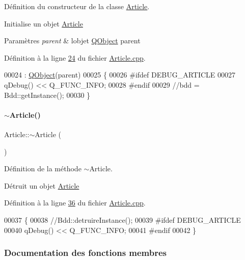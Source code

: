 Définition du constructeur de la classe \hyperlink{class_article}{Article}. 

Initialise un objet \hyperlink{class_article}{Article} 
\begin{DoxyParams}{Paramètres}
{\em parent} & l\textquotesingle{}objet \hyperlink{class_q_object}{Q\+Object} parent \\
\hline
\end{DoxyParams}


Définition à la ligne \hyperlink{_article_8cpp_source_l00024}{24} du fichier \hyperlink{_article_8cpp_source}{Article.\+cpp}.


\begin{DoxyCode}
00024                                 : \hyperlink{class_q_object}{QObject}(parent)
00025 \{
00026 \textcolor{preprocessor}{    #ifdef DEBUG\_ARTICLE}
00027         qDebug() << Q\_FUNC\_INFO;
00028 \textcolor{preprocessor}{    #endif}
00029     \textcolor{comment}{//bdd = Bdd::getInstance();}
00030 \}
\end{DoxyCode}
\mbox{\label{class_article_a5c429e49b30104b1069044d0e1a6aa1a}} 
\paragraph{\texorpdfstring{$\sim$\+Article()}{~Article()}}
{\footnotesize\ttfamily Article\+::$\sim$\+Article (\begin{DoxyParamCaption}{ }\end{DoxyParamCaption})}



Définition de la méthode $\sim$\+Article. 

Détruit un objet \hyperlink{class_article}{Article} 

Définition à la ligne \hyperlink{_article_8cpp_source_l00036}{36} du fichier \hyperlink{_article_8cpp_source}{Article.\+cpp}.


\begin{DoxyCode}
00037 \{
00038     \textcolor{comment}{//Bdd::detruireInstance();}
00039 \textcolor{preprocessor}{    #ifdef DEBUG\_ARTICLE}
00040         qDebug() << Q\_FUNC\_INFO;
00041 \textcolor{preprocessor}{    #endif}
00042 \}
\end{DoxyCode}


\subsubsection{Documentation des fonctions membres}
\mbox{\label{class_article_a81e89d4821991a69277f3a0f8e88a001}} 
